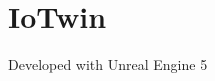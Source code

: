 \chapter{Io\+Twin}
\hypertarget{md_src_2ue_2IoTwin_2README}{}\label{md_src_2ue_2IoTwin_2README}
\label{md_src_2ue_2IoTwin_2README_autotoc_md0}%
%
 Developed with Unreal Engine 5 